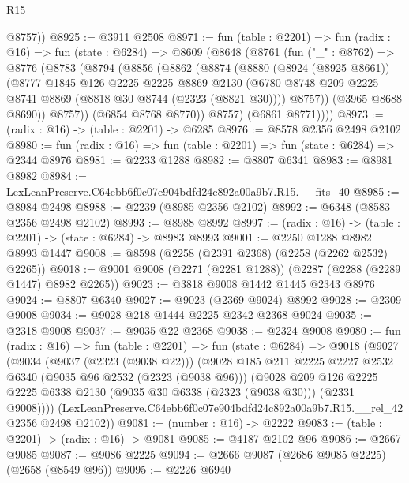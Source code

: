 \begin{lexlean}{R15}
\begin{coremodule}
        @8757))
@8925 := @3911 @2508
@8971 := fun (table : @2201) =>
  fun (radix : @16) =>
  fun (state : @6284) =>
  @8609
    (@8648
      (@8761
        (fun ("_" : @8762) =>
        @8776
          (@8783
            (@8794
              (@8856
                (@8862
                  (@8874
                    (@8880
                      (@8924 (@8925 @8661))
                      (@8777
                        @1845
                        @126
                        @2225
                        @2225
                        @8869
                        @2130
                        (@6780 @8748 @209 @2225 @8741 @8869 (@8818 @30 @8744 (@2323 (@8821 @30))))
                        @8757))
                    (@3965 @8688 @8690))
                  @8757))
              (@6854 @8768 @8770))
            @8757)
          (@6861 @8771))))
@8973 := (radix : @16) -> (table : @2201) -> @6285
@8976 := @8578 @2356 @2498 @2102
@8980 := fun (radix : @16) => fun (table : @2201) => fun (state : @6284) => @2344 @8976
@8981 := @2233 @1288
@8982 := @8807 @6341
@8983 := @8981 @8982
@8984 := LexLeanPreserve.C64ebb6f0c07e904bdfd24c892a00a9b7.R15.__fits_40
@8985 := @8984 @2498
@8988 := @2239 (@8985 @2356 @2102)
@8992 := @6348 (@8583 @2356 @2498 @2102)
@8993 := @8988 @8992
@8997 := (radix : @16) -> (table : @2201) -> (state : @6284) -> @8983 @8993
@9001 := @2250 @1288 @8982 @8993 @1447
@9008 := @8598 (@2258 (@2391 @2368) (@2258 (@2262 @2532) @2265))
@9018 := @9001 @9008 (@2271 (@2281 @1288)) (@2287 (@2288 (@2289 @1447) @8982 @2265))
@9023 := @3818 @9008 @1442 @1445 @2343 @8976
@9024 := @8807 @6340
@9027 := @9023 (@2369 @9024) @8992
@9028 := @2309 @9008
@9034 := @9028 @218 @1444 @2225 @2342 @2368 @9024
@9035 := @2318 @9008
@9037 := @9035 @22 @2368
@9038 := @2324 @9008
@9080 := fun (radix : @16) =>
  fun (table : @2201) =>
  fun (state : @6284) =>
  @9018
    (@9027
      (@9034
        (@9037 (@2323 (@9038 @22)))
        (@9028
          @185
          @211
          @2225
          @2227
          @2532
          @6340
          (@9035 @96 @2532 (@2323 (@9038 @96)))
          (@9028
            @209
            @126
            @2225
            @2225
            @6338
            @2130
            (@9035 @30 @6338 (@2323 (@9038 @30)))
            (@2331 @9008))))
      (LexLeanPreserve.C64ebb6f0c07e904bdfd24c892a00a9b7.R15.__rel_42 @2356 @2498 @2102))
@9081 := (number : @16) -> @2222
@9083 := (table : @2201) -> (radix : @16) -> @9081
@9085 := @4187 @2102 @96
@9086 := @2667 @9085
@9087 := @9086 @2225
@9094 := @2666 @9087 (@2686 @9085 @2225) (@2658 (@8549 @96))
@9095 := @2226 @6940

\end{coremodule}
\end{lexlean}
